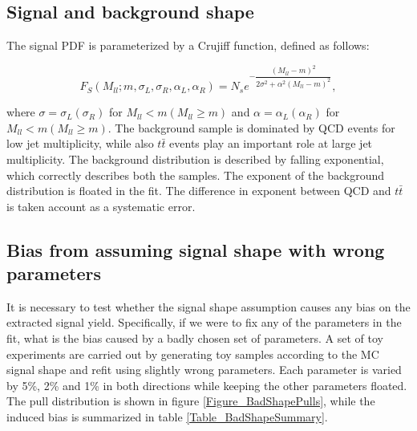 \documentclass{cmspaper}
\begin{document}

\subsection{Signal and background shape}

The signal PDF is parameterized by a Crujiff function, defined as follows:

\begin{equation}
F_S(M_{ll}; m, \sigma_L, \sigma_R, \alpha_L, \alpha_R) = N_s e^{-\dfrac{(M_{ll} - m)^2}{2 \sigma^2 + \alpha^2 (M_{ll} - m)^2}},\nonumber
\end{equation}

where $\sigma = \sigma_L (\sigma_R)$ for $M_{ll} < m (M_{ll} \geq m)$
and $\alpha = \alpha_L (\alpha_R)$ for $M_{ll} < m (M_{ll} \geq m)$.
The background sample is dominated by QCD events for low jet
multiplicity, while also $t\bar{t}$ events play an important role at
large jet multiplicity.  The background distribution is described by
falling exponential, which correctly describes both the samples.  The
exponent of the background distribution is floated in the fit. The
difference in exponent between QCD and $t \bar t$ is taken account as
a systematic error.

\subsection{Bias from assuming signal shape with wrong parameters}

It is necessary to test whether the signal shape assumption causes any
bias on the extracted signal yield.  Specifically, if we were to fix
any of the parameters in the fit, what is the bias caused by a badly
chosen set of parameters.  A set of toy experiments are carried out by
generating toy samples according to the MC signal shape and refit
using slightly wrong parameters.  Each parameter is varied by 5\%, 2\%
and 1\% in both directions while keeping the other parameters floated.
The pull distribution is shown in figure \ref{Figure_BadShapePulls},
while the induced bias is summarized in table
\ref{Table_BadShapeSummary}.
\end{document}
